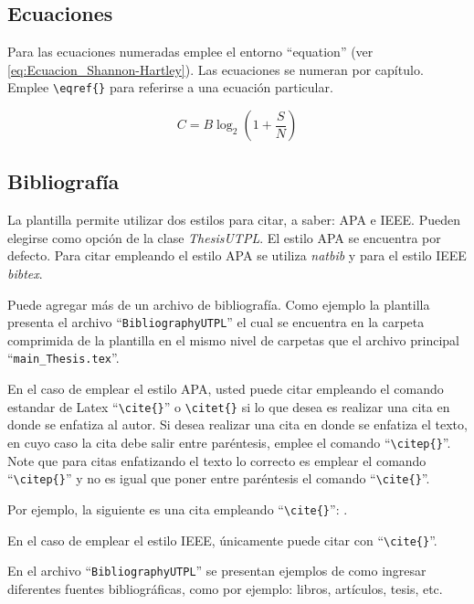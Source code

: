 \subsection{Ecuaciones}
Para las ecuaciones numeradas emplee el entorno ``equation'' (ver \eqref{eq:Ecuacion_Shannon-Hartley}). Las ecuaciones se numeran por capítulo. Emplee  \lstinline|\eqref{}| para referirse a una ecuación particular.  

\begin{equation}\label{eq:Ecuacion_Shannon-Hartley}
C = B \log_{2} \left( 1 + \frac{S}{N} \right) 
\end{equation}


\subsection{Bibliografía}
\label{sec:Bibliografia}
La plantilla permite utilizar dos estilos para citar, a saber: APA e IEEE. Pueden elegirse como opción de la clase \textit{ThesisUTPL}. El estilo APA se encuentra por defecto. Para citar empleando el estilo APA se utiliza \textit{natbib} y para el estilo IEEE \textit{bibtex}. 

Puede agregar más de un archivo de bibliografía. Como ejemplo la plantilla presenta el archivo ``\lstinline|BibliographyUTPL|'' el cual se encuentra en la carpeta comprimida de la plantilla en el mismo nivel de carpetas que el archivo principal ``\lstinline|main_Thesis.tex|''. 
 
En el caso de emplear el estilo APA, usted puede citar empleando el comando estandar de Latex ``\lstinline|\cite{}|'' o \lstinline|\citet{}| si lo que desea es realizar una cita en donde se enfatiza al autor. Si desea realizar una cita en donde se enfatiza el texto, en cuyo caso la cita debe salir entre paréntesis, emplee el comando ``\lstinline|\citep{}|''. Note que para citas enfatizando el texto lo correcto es emplear el comando ``\lstinline|\citep{}|'' y no es igual que poner entre paréntesis el comando ``\lstinline|\cite{}|''. 

Por ejemplo, la siguiente es una cita empleando ``\lstinline|\cite{}|'': \cite{sandoval2017hybrid}. 

En el caso de emplear el estilo IEEE, únicamente puede citar con ``\lstinline|\cite{}|''. 

En el archivo ``\lstinline|BibliographyUTPL|'' se presentan ejemplos de como ingresar diferentes fuentes bibliográficas, como por ejemplo: libros, artículos, tesis, etc. 
